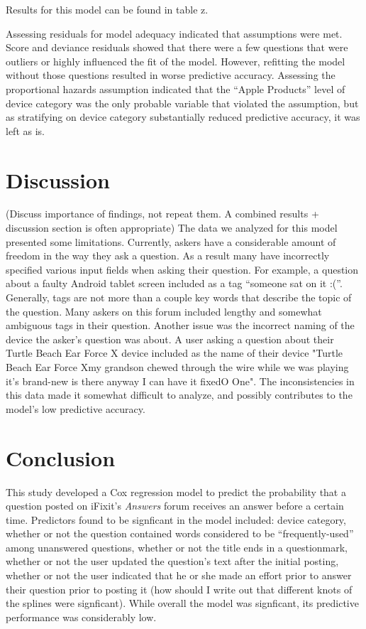 \documentclass[12pt]{article}
\begin{document}
Results for this model can be found in table z.

Assessing residuals for model adequacy indicated that assumptions were met. Score and deviance residuals showed that there were a few questions that were outliers or highly influenced the fit of the model. However, refitting the model without those questions resulted in worse predictive accuracy. Assessing the proportional hazards assumption indicated that the ``Apple Products'' level of device category was the only probable variable that violated the assumption, but as stratifying on device category substantially reduced predictive accuracy, it was left as is. 


\section{Discussion}

(Discuss importance of findings, not repeat them. A combined results + discussion section is often appropriate) 
The data we analyzed for this model presented some limitations. Currently, askers have a considerable amount of freedom in the way they ask a question. As a result many have incorrectly specified various input fields when asking their question. For example, a question about a faulty Android tablet screen included as a tag ``someone sat on it :(''. Generally, tags are not more than a couple key words that describe the topic of the question. Many askers on this forum included lengthy and somewhat ambiguous tags in their question. Another issue was the incorrect naming of the device the asker's question was about. A user asking a question about their Turtle Beach Ear Force X device included as the name of their device "Turtle Beach Ear Force Xmy grandson chewed through the wire while we was playing it's brand-new is there anyway I can have it fixedO One". The inconsistencies in this data made it somewhat difficult to analyze, and possibly contributes to the model's low predictive accuracy. 

\section{Conclusion}

This study developed a Cox regression model to predict the probability that a question posted on iFixit's \textit{Answers} forum receives an answer before a certain time. Predictors found to be signficant in the model included: device category, whether or not the question contained words considered to be ``frequently-used'' among unanswered questions, whether or not the title ends in a questionmark, whether or not the user updated the question's text after the initial posting, whether or not the user indicated that he or she made an effort prior to answer their question prior to posting it (how should I write out that different knots of the splines were signficant). While overall the model was signficant, its predictive performance was considerably low. 
\end{document}

